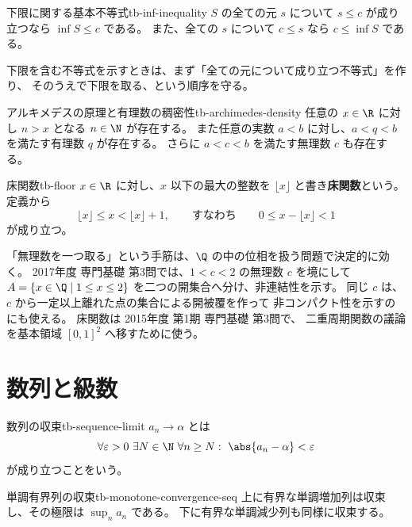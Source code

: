 \begin{proposition}{下限に関する基本不等式}{tb-inf-inequality}
$S$ の全ての元 $s$ について $s\le c$ が成り立つなら $\inf S\le c$ である。
また、全ての $s$ について $c\le s$ なら $c\le\inf S$ である。
\end{proposition}

下限を含む不等式を示すときは、まず「全ての元について成り立つ不等式」を作り、
そのうえで下限を取る、という順序を守る。

\begin{theorem}{アルキメデスの原理と有理数の稠密性}{tb-archimedes-density}
任意の $x\in\R$ に対し $n>x$ となる $n\in\N$ が存在する。
また任意の実数 $a<b$ に対し、$a<q<b$ を満たす有理数 $q$ が存在する。
さらに $a<c<b$ を満たす無理数 $c$ も存在する。
\end{theorem}

\begin{definition}{床関数}{tb-floor}
$x\in\R$ に対し、$x$ 以下の最大の整数を $\lfloor x\rfloor$ と書き\textbf{床関数}という。
定義から
\[
\lfloor x\rfloor\le x<\lfloor x\rfloor+1,
\qquad\text{すなわち}\qquad
0\le x-\lfloor x\rfloor<1
\]
が成り立つ。
\end{definition}

\begin{memo*}
「無理数を一つ取る」という手筋は、$\Q$ の中の位相を扱う問題で決定的に効く。
2017年度 専門基礎 第3問では、$1<c<2$ の無理数 $c$ を境にして
$A=\{x\in\Q\mid1\le x\le2\}$ を二つの開集合へ分け、非連結性を示す。
同じ $c$ は、$c$ から一定以上離れた点の集合による開被覆を作って
非コンパクト性を示すのにも使える。
床関数は 2015年度 第1期 専門基礎 第3問で、
二重周期関数の議論を基本領域 $[0,1]^2$ へ移すために使う。
\end{memo*}

\section{数列と級数}

\begin{definition}{数列の収束}{tb-sequence-limit}
$a_n\to\alpha$ とは
\[
\forall\varepsilon>0\ \exists N\in\N\ \forall n\ge N:\ \abs{a_n-\alpha}<\varepsilon
\]
が成り立つことをいう。
\end{definition}

\begin{theorem}{単調有界列の収束}{tb-monotone-convergence-seq}
上に有界な単調増加列は収束し、その極限は $\sup_n a_n$ である。
下に有界な単調減少列も同様に収束する。
\end{theorem}


